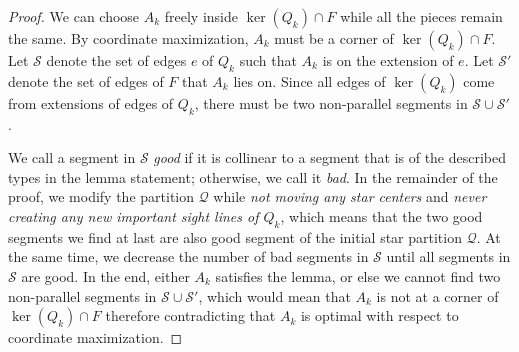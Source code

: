 \documentclass[10pt,a4paper]{article}
\begin{document}
\begin{proof}
    We can choose $A_k$ freely inside $\ker(Q_k) \cap F$ while all the pieces remain the same. 
    By coordinate maximization, $A_k$ must be a corner of $\ker(Q_k) \cap F$.
    Let $\mathcal{S}$ denote the set of edges $e$ of $Q_k$ such that $A_k$ is on the extension of $e$. 
    Let $\mathcal{S'}$ denote the set of edges of $F$ that $A_k$ lies on. 
    Since all edges of $\ker(Q_k)$ come from extensions of edges of $Q_k$, there must be two non-parallel segments in $\mathcal{S} \cup \mathcal{S'}$.

    We call a segment in $\mathcal{S}$ \emph{good} if it is collinear to a segment that is of the described types in the lemma statement; otherwise, we call it \emph{bad}.
    In the remainder of the proof, we modify the partition $\mathcal{Q}$ while \textit{not moving any star centers} and \textit{never creating any new important sight lines of $Q_k$}, which means that the two good segments we find at last are also good segment of the initial star partition $\mathcal Q$. 
    At the same time, we decrease the number of bad segments in $\mathcal{S}$ until all segments in $\mathcal{S}$ are good.
    In the end, either $A_k$ satisfies the lemma, or else we cannot find two non-parallel segments in $\mathcal{S} \cup \mathcal{S}'$, which would mean that $A_k$ is not at a corner of $\ker(Q_k) \cap F$ therefore contradicting that $A_k$ is optimal with respect to coordinate maximization.


\end{proof}
\end{document}
